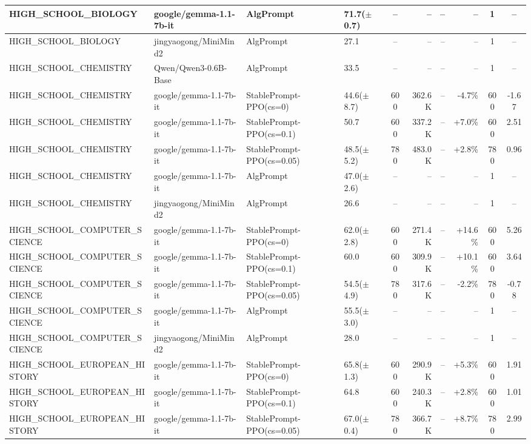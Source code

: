 {\begin{longtable}{@{}p{5.5cm}p{4.5cm}p{2.5cm}lcrrrcc@{}}
HIGH\_SCHOOL\_BIOLOGY & google/gemma-1.1-7b-it & AlgPrompt & 71.7($\pm$0.7) & -- & -- & -- & -- & 1 & -- \\
\midrule
HIGH\_SCHOOL\_BIOLOGY & jingyaogong/MiniMind2 & AlgPrompt & 27.1 & -- & -- & -- & -- & 1 & -- \\
\midrule
HIGH\_SCHOOL\_CHEMISTRY & Qwen/Qwen3-0.6B-Base & AlgPrompt & 33.5 & -- & -- & -- & -- & 1 & -- \\
\midrule
HIGH\_SCHOOL\_CHEMISTRY & google/gemma-1.1-7b-it & StablePrompt-PPO(cs=0) & 44.6($\pm$8.7) & 600 & 362.6K & -- & -4.7\% & 600 & -1.67 \\
HIGH\_SCHOOL\_CHEMISTRY & google/gemma-1.1-7b-it & StablePrompt-PPO(cs=0.1) & 50.7 & 600 & 337.2K & -- & +7.0\% & 600 & 2.51 \\
HIGH\_SCHOOL\_CHEMISTRY & google/gemma-1.1-7b-it & StablePrompt-PPO(cs=0.05) & 48.5($\pm$5.2) & 780 & 483.0K & -- & +2.8\% & 780 & 0.96 \\
HIGH\_SCHOOL\_CHEMISTRY & google/gemma-1.1-7b-it & AlgPrompt & 47.0($\pm$2.6) & -- & -- & -- & -- & 1 & -- \\
\midrule
HIGH\_SCHOOL\_CHEMISTRY & jingyaogong/MiniMind2 & AlgPrompt & 26.6 & -- & -- & -- & -- & 1 & -- \\
\midrule
HIGH\_SCHOOL\_COMPUTER\_SCIENCE & google/gemma-1.1-7b-it & StablePrompt-PPO(cs=0) & 62.0($\pm$2.8) & 600 & 271.4K & -- & +14.6\% & 600 & 5.26 \\
HIGH\_SCHOOL\_COMPUTER\_SCIENCE & google/gemma-1.1-7b-it & StablePrompt-PPO(cs=0.1) & 60.0 & 600 & 309.9K & -- & +10.1\% & 600 & 3.64 \\
HIGH\_SCHOOL\_COMPUTER\_SCIENCE & google/gemma-1.1-7b-it & StablePrompt-PPO(cs=0.05) & 54.5($\pm$4.9) & 780 & 317.6K & -- & -2.2\% & 780 & -0.78 \\
HIGH\_SCHOOL\_COMPUTER\_SCIENCE & google/gemma-1.1-7b-it & AlgPrompt & 55.5($\pm$3.0) & -- & -- & -- & -- & 1 & -- \\
\midrule
HIGH\_SCHOOL\_COMPUTER\_SCIENCE & jingyaogong/MiniMind2 & AlgPrompt & 28.0 & -- & -- & -- & -- & 1 & -- \\
\midrule
HIGH\_SCHOOL\_EUROPEAN\_HISTORY & google/gemma-1.1-7b-it & StablePrompt-PPO(cs=0) & 65.8($\pm$1.3) & 600 & 290.9K & -- & +5.3\% & 600 & 1.91 \\
HIGH\_SCHOOL\_EUROPEAN\_HISTORY & google/gemma-1.1-7b-it & StablePrompt-PPO(cs=0.1) & 64.8 & 600 & 240.3K & -- & +2.8\% & 600 & 1.01 \\
HIGH\_SCHOOL\_EUROPEAN\_HISTORY & google/gemma-1.1-7b-it & StablePrompt-PPO(cs=0.05) & 67.0($\pm$0.4) & 780 & 366.7K & -- & +8.7\% & 780 & 2.99 \\

\end{longtable}}
